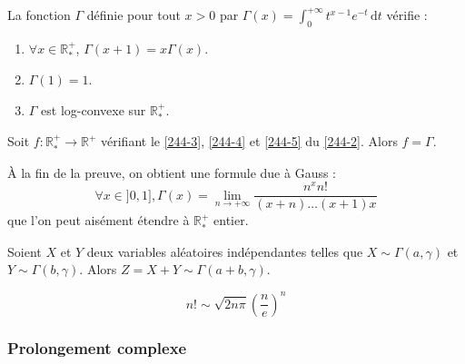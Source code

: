 
  \begin{lemma}
    \label{244-2}
    La fonction $\Gamma$ définie pour tout $x > 0$ par $\Gamma(x) = \int_0^{+\infty} t^{x-1} e^{-t} \, \mathrm{d}t$ vérifie :
    \begin{enumerate}[label=(\roman*)]
      \item \label{244-3} $\forall x \in \mathbb{R}^+_*$, $\Gamma(x+1) = x\Gamma(x)$.
      \item \label{244-4} $\Gamma(1) = 1$.
      \item \label{244-5} $\Gamma$ est log-convexe sur $\mathbb{R}^+_*$.
    \end{enumerate}
  \end{lemma}


  \begin{theorem}
    Soit $f : \mathbb{R}^+_* \rightarrow \mathbb{R}^+$ vérifiant le \cref{244-3}, \cref{244-4} et \cref{244-5} du \cref{244-2}. Alors $f = \Gamma$.
  \end{theorem}

  \begin{remark}
    À la fin de la preuve, on obtient une formule due à Gauss :
    \[ \forall x \in ]0, 1], \Gamma(x) = \lim_{n \rightarrow +\infty} \frac{n^x n!}{(x+n) \dots (x+1)x} \]
    que l'on peut aisément étendre à $\mathbb{R}^+_*$ entier.
  \end{remark}


  \begin{lemma}
    Soient $X$ et $Y$ deux variables aléatoires indépendantes telles que $X \sim \Gamma(a, \gamma)$ et $Y \sim \Gamma(b, \gamma)$. Alors $Z = X + Y \sim \Gamma(a+b, \gamma)$.
  \end{lemma}


  \begin{application}
    \[ n! \sim \sqrt{2n\pi} \left(\frac{n}{e} \right)^n \]
  \end{application}

  \subsubsection{Prolongement complexe}



